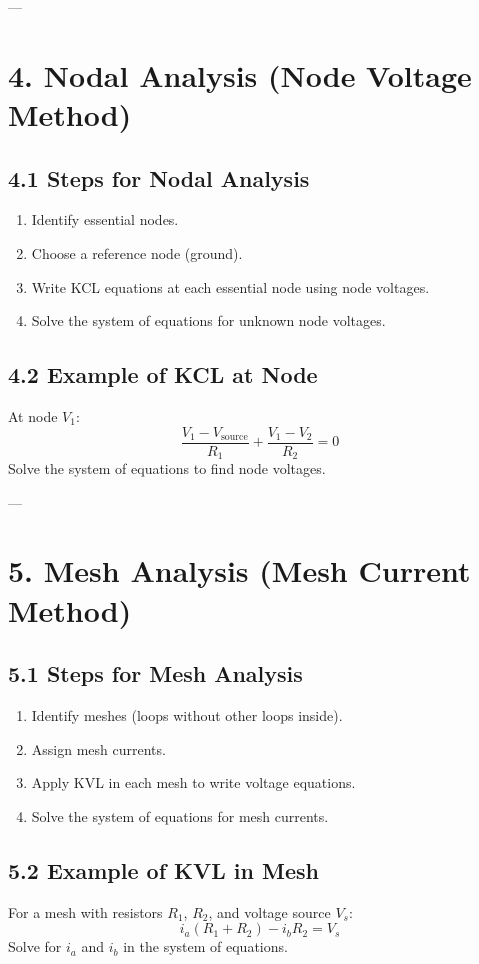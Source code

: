 \documentclass[10pt]{article}
\begin{document}
\begin{multicols}{2}
---

\section*{4. Nodal Analysis (Node Voltage Method)}

\subsection*{4.1 Steps for Nodal Analysis}
\begin{enumerate}\itemsep0pt
    \item Identify essential nodes.
    \item Choose a reference node (ground).
    \item Write KCL equations at each essential node using node voltages.
    \item Solve the system of equations for unknown node voltages.
\end{enumerate}

\subsection*{4.2 Example of KCL at Node}
At node \( V_1 \):
\[
\frac{V_1 - V_{\text{source}}}{R_1} + \frac{V_1 - V_2}{R_2} = 0
\]
Solve the system of equations to find node voltages.

---

\section*{5. Mesh Analysis (Mesh Current Method)}

\subsection*{5.1 Steps for Mesh Analysis}
\begin{enumerate}\itemsep0pt
    \item Identify meshes (loops without other loops inside).
    \item Assign mesh currents.
    \item Apply KVL in each mesh to write voltage equations.
    \item Solve the system of equations for mesh currents.
\end{enumerate}

\subsection*{5.2 Example of KVL in Mesh}
For a mesh with resistors \( R_1 \), \( R_2 \), and voltage source \( V_s \):
\[
i_a (R_1 + R_2) - i_b R_2 = V_s
\]
Solve for \( i_a \) and \( i_b \) in the system of equations.


\end{multicols}
\end{document}
